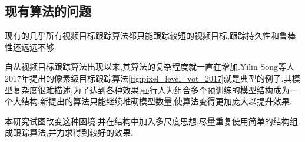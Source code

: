 \subsection{现有算法的问题} \label{section:vot_problems}
现有的几乎所有视频目标跟踪算法都只能跟踪较短的视频目标,跟踪持久性和鲁棒性还远远不够.
\par
自从视频目标跟踪算法出现以来,其算法的复杂程度就一直在增加.Yilin Song等人2017年提出的像素级目标跟踪算法\ref{fig:pixel_level_vot_2017}就是典型的例子,其模型复杂度很难描述,为了达到各种效果,强行人为组合多个预训练的模型结构成为一个大结构.新提出的算法只能继续堆砌模型数量,使算法变得更加庞大以提升效果.
\par
本研究试图改变这种困境,并在结构中加入多尺度思想,尽量重复使用简单的结构组成跟踪算法,并力求得到较好的效果.
